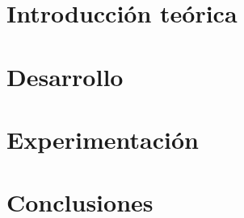 \documentclass[12pt, a4paper]{report}
\begin{document}


\tableofcontents{}

\chapter{Introducción teórica} 


\chapter{Desarrollo}


\chapter{Experimentación}


\chapter{Conclusiones}

\end{document}
